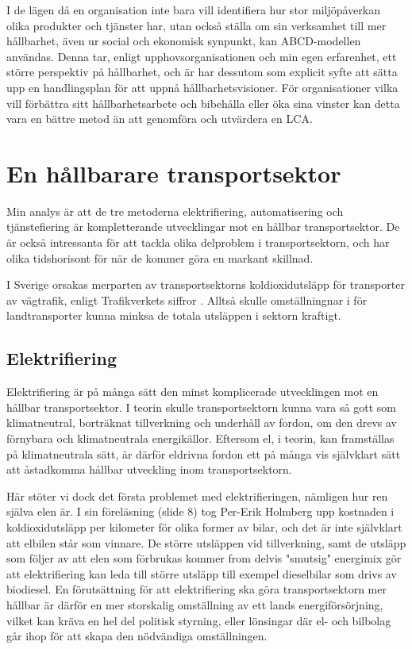 \documentclass{article}
\begin{document}
I de lägen då en organisation inte bara vill identifiera hur stor miljöpåverkan olika produkter och tjänster har, utan också ställa om sin verksamhet till mer hållbarhet, även ur social och ekonomisk synpunkt, kan ABCD-modellen användas. Denna tar, enligt upphovsorganisationen och min egen erfarenhet, ett större perspektiv på hållbarhet, och är har dessutom som explicit syfte att sätta upp en handlingsplan för att uppnå hållbarhetsvisioner. För organisationer vilka vill förbättra sitt hållbarhetsarbete och bibehålla eller öka sina vinster kan detta vara en bättre metod än att genomföra och utvärdera en LCA.


\clearpage
\section{En hållbarare transportsektor}

Min analys är att de tre metoderna elektrifiering, automatisering och tjänstefiering är kompletterande utvecklingar mot en hållbar transportsektor. De är också intressanta för att tackla olika delproblem i transportsektorn, och har olika tidshorisont för när de kommer göra en markant skillnad. 

I Sverige orsakas merparten av transportsektorns koldioxidutsläpp för transporter av vägtrafik, enligt Trafikverkets siffror . Alltså skulle omställningnar i för landtransporter kunna minksa de totala utsläppen i sektorn kraftigt.

\subsection{Elektrifiering}

Elektrifiering är på många sätt den minst komplicerade utvecklingen mot en hållbar transportsektor. I teorin skulle transportsektorn kunna vara så gott som klimatneutral, borträknat tillverkning och underhåll av fordon, om den drevs av förnybara och klimatneutrala energikällor. Eftersom el, i teorin, kan framställas på klimatneutrala sätt, är därför eldrivna fordon ett på många vis självklart sätt att åstadkomma hållbar utveckling inom transportsektorn.

Här stöter vi dock det första problemet med elektrifieringen, nämligen hur ren själva elen är. I sin föreläsning (slide 8) tog Per-Erik Holmberg upp kostnaden i koldioxidutsläpp per kilometer för olika former av bilar, och det är inte självklart att elbilen står som vinnare. De större utsläppen vid tillverkning, samt de utsläpp som följer av att elen som förbrukas kommer from delvis "smutsig" energimix gör att elektrifiering kan leda till större utsläpp till exempel dieselbilar som drivs av biodiesel. En förutsättning för att elektrifiering ska göra transportsektorn mer hållbar är därför en mer storskalig omställning av ett lands energiförsörjning, vilket kan kräva en hel del politisk styrning, eller lönsingar där el- och bilbolag går ihop för att skapa den nödvändiga omställningen.
\end{document}

